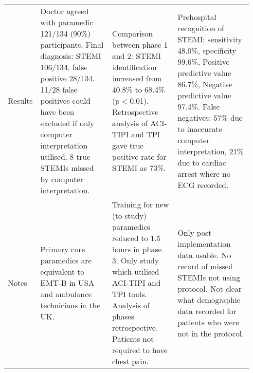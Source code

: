 \begin{longtable}{LAAA}
Results&Doctor agreed with paramedic 121\slash 134 (90\%) participants. Final diagnosis: STEMI 106\slash 134, false positive 28\slash 134. 11\slash 28 false positives could have been excluded if only computer interpretation utilised. 8 true STEMIs missed by computer interpretation.&Comparison between phase 1 and 2: STEMI identification increased from 40.8\% to 68.4\% (p$<$0.01). Retrospective analysis of ACI-TIPI and TPI gave true positive rate for STEMI as 73\%.&Prehospital recognition of STEMI: sensitivity 48.0\%, specificity 99.6\%, Positive predictive value 86.7\%, Negative predictive value 97.4\%. False negatives: 57\% due to inaccurate computer interpretation, 21\% due to cardiac arrest where no ECG recorded.\\
Notes&Primary care paramedics are equivalent to EMT-B in USA and ambulance technicians in the UK.&Training for new (to study) paramedics reduced to 1.5 hours in phase 3. Only study which utilised ACI-TIPI and TPI tools. Analysis of phases retrospective. Patients not required to have chest pain.&Only post-implementation data usable. No record of missed STEMIs not using protocol. Not clear what demographic data recorded for patients who were not in the protocol.\\
\end{longtable}
\renewcommand{\arraystretch}{1}
\normalsize